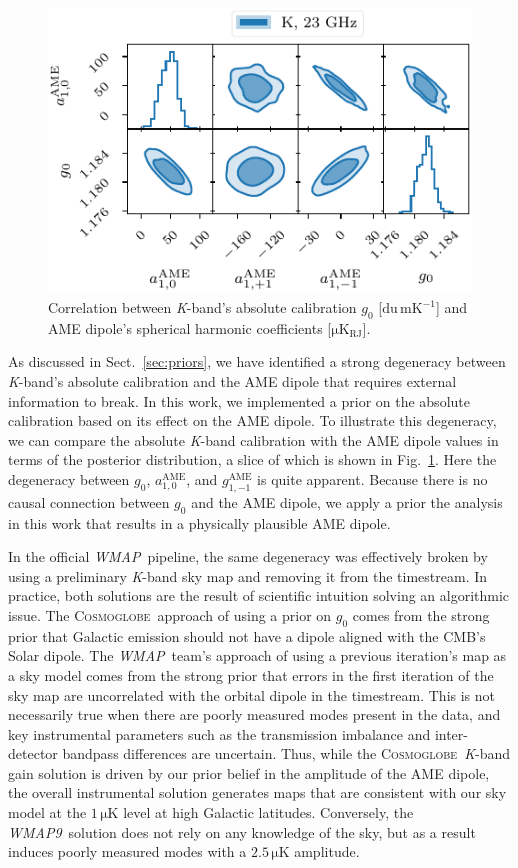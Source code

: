 \documentclass[twocolumn]{../../common/aa}
\def\WMAP{\emph{WMAP}}
\def\WMAPnine{\emph{WMAP9}}
\newcommand{\cosmoglobe}{\textsc{Cosmoglobe}}
\newcommand{\K}[0]{\textit K}
\begin{document}
\begin{figure}
	\includegraphics[width=\columnwidth]{figures/ame_dipole_vs_g0_K.pdf}
	\caption{Correlation between \K-band's absolute calibration $g_0$ [$\mathrm{du\,mK^{-1}}$] and AME dipole's spherical harmonic coefficients [$\mathrm{\mu K_{RJ}}$].}
	\label{fig:ame_g0}
\end{figure}

As discussed in Sect.~\ref{sec:priors}, we have identified a strong degeneracy between \K-band's absolute calibration and the AME dipole that requires external information to break. In this work, we implemented a prior on the absolute calibration based on its effect on the AME dipole. To illustrate this degeneracy, we can compare the absolute \K-band calibration with the AME dipole values in terms of the posterior distribution, a slice of which is shown in Fig.~\ref{fig:ame_g0}. Here the degeneracy between $g_0$, $a_{1,0}^\mathrm{AME}$, and $g_{1,-1}^\mathrm{AME}$ is quite apparent. Because there is no causal connection between $g_0$ and the AME dipole, we apply a prior the analysis in this work that results in a physically plausible AME dipole.

In the official \WMAP\ pipeline, the same degeneracy was effectively broken by using a preliminary \K-band sky map and removing it from the timestream.  In practice, both solutions are the result of scientific intuition solving an algorithmic issue. The \cosmoglobe\ approach of using a prior on $g_0$ comes from the strong prior that Galactic emission should not have a dipole aligned with the CMB's Solar dipole. The \WMAP\ team's approach of using a previous iteration's map as a sky model comes from the strong prior that errors in the first iteration of the sky map are uncorrelated with the orbital dipole in the timestream. This is not necessarily true when there are poorly measured modes present in the data, and key instrumental parameters such as the transmission imbalance and inter-detector bandpass differences are uncertain. Thus, while the \cosmoglobe\ \K-band gain solution is driven by our prior belief in the amplitude of the AME dipole, the overall instrumental solution generates maps that are consistent with our sky model at the $1\,\mathrm{\mu K}$ level at high Galactic latitudes. Conversely, the \WMAPnine\ solution does not rely on any knowledge of the sky, but as a result induces poorly measured modes with a $2.5\,\mathrm{\mu K}$ amplitude. 
\end{document}
